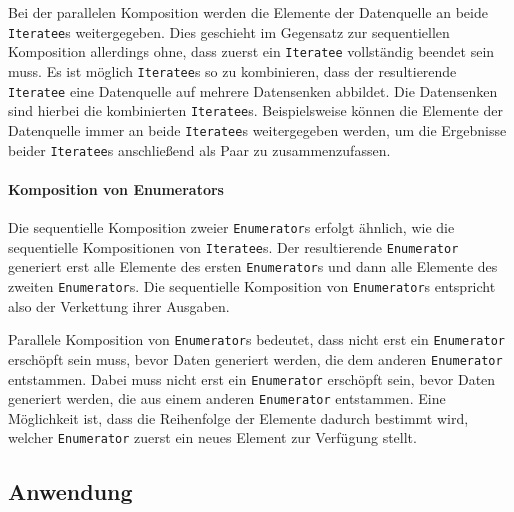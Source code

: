 \documentclass[draft=false
              ,paper=a4
              ,twoside=false
              ,fontsize=11pt
              ,headsepline
              ,BCOR10mm
              ,DIV11
              ]{scrbook}
\begin{document}
Bei der parallelen Komposition werden die Elemente der Datenquelle an beide \lstinline|Iteratee|s weitergegeben.
Dies geschieht im Gegensatz zur sequentiellen Komposition allerdings ohne, dass zuerst ein \lstinline|Iteratee| vollständig beendet sein muss.
Es ist möglich \lstinline|Iteratee|s so zu kombinieren, dass der resultierende \lstinline|Iteratee| eine Datenquelle auf mehrere Datensenken abbildet.
Die Datensenken sind hierbei die kombinierten \lstinline|Iteratee|s.
Beispielsweise können die Elemente der Datenquelle immer an beide \lstinline|Iteratee|s weitergegeben werden, um die Ergebnisse beider \lstinline|Iteratee|s anschließend als Paar zu zusammenzufassen. %


\paragraph{Komposition von Enumerators} %
\label{par:komposition_von_enumerators}\mbox{} %

Die sequentielle Komposition zweier \lstinline|Enumerator|s erfolgt ähnlich, wie die sequentielle Kompositionen von \lstinline|Iteratee|s.
Der resultierende \lstinline|Enumerator| generiert erst alle Elemente des ersten \lstinline|Enumerator|s und dann alle Elemente des zweiten \lstinline|Enumerator|s.
Die sequentielle Komposition von \lstinline|Enumerator|s entspricht also der Verkettung ihrer Ausgaben. %

Parallele Komposition von \lstinline|Enumerator|s bedeutet, dass nicht erst ein \lstinline|Enumerator| erschöpft sein muss, bevor Daten generiert werden, die dem anderen \lstinline|Enumerator| entstammen.
Dabei muss nicht erst ein \lstinline|Enumerator| erschöpft sein, bevor Daten generiert werden, die aus einem anderen \lstinline|Enumerator| entstammen.
Eine Möglichkeit ist, dass die Reihenfolge der Elemente dadurch bestimmt wird, welcher \lstinline|Enumerator| zuerst ein neues Element zur Verfügung stellt. %






\subsection{Anwendung} %
\label{sub:anwendung}
\end{document}
